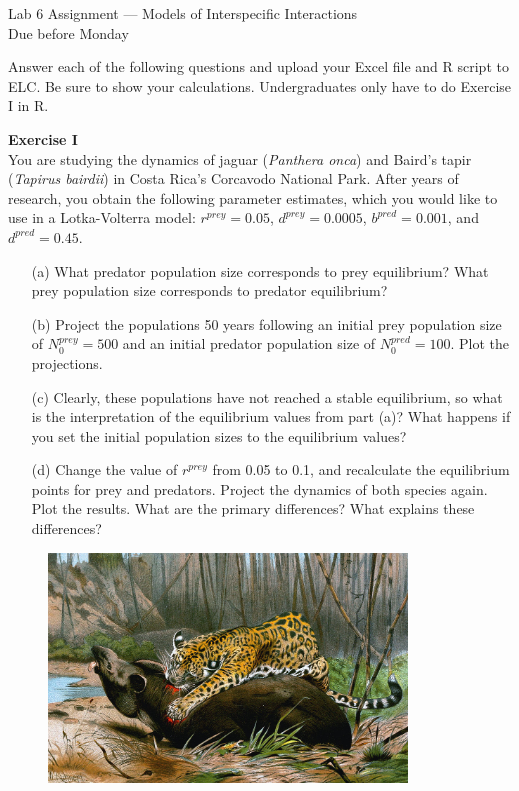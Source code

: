\documentclass[12pt]{article}\usepackage[]{graphicx}\usepackage[]{color}
\begin{document}
{
  \Large
  \centering
  Lab 6 Assignment --- Models of Interspecific Interactions \\
  Due before Monday \par
}

Answer each of the following questions and upload your Excel file and
R script to ELC. Be sure to show your calculations. Undergraduates
only have to do Exercise I in R.  \\


\vspace{6pt}

{\bf Exercise I \\}
You are studying the dynamics of jaguar (\textit{Panthera onca}) and Baird's
tapir (\textit{Tapirus bairdii}) in Costa Rica's Corcavodo National Park. After
years of research, you obtain the following parameter estimates, which
you would like to use in a Lotka-Volterra model: $r^{prey}=0.05$,
$d^{prey}=0.0005$, $b^{pred}=0.001$, and $d^{pred}=0.45$.  
\begin{enumerate}
  \item[(a)] What predator population size corresponds to prey equilibrium?
    What prey population size corresponds to predator equilibrium? 
  \item[(b)] Project the populations 50 years following an initial prey
    population size of $N_0^{prey}=500$ and an initial predator
    population size of $N_0^{pred}=100$. Plot the projections.  
  \item[(c)] Clearly, these populations have not reached a stable
    equilibrium, so what is the interpretation of the equilibrium
    values from part (a)? What happens if you set the initial
    population sizes to the equilibrium values?  
  \item[(d)] Change the value of $r^{prey}$ from 0.05 to 0.1,
    and recalculate the equilibrium points for prey and
    predators. Project the dynamics of both species again. Plot the
    results. What are the primary differences?  What explains these
    differences? 
\end{enumerate}

\vspace{12pt}

\begin{figure}[h!]
  \centering
  \includegraphics[width=0.85\textwidth]{jaguar_killing_tapir}
  \label{fig:jag-tapir}
\end{figure}
\end{document}

